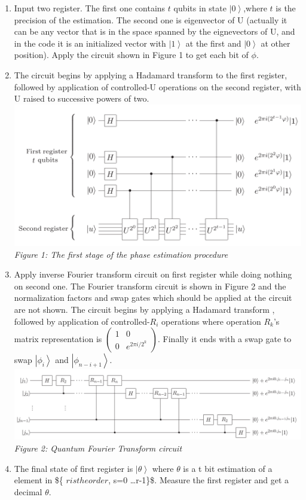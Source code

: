 \documentclass[11pt]{article}
\makeatletter
\def\maxwidth{\ifdim\Gin@nat@width>\linewidth\linewidth
    \else\Gin@nat@width\fi}
\let\Oldincludegraphics\includegraphics
\renewcommand{\includegraphics}[1]{\Oldincludegraphics[width=.8\maxwidth]{#1}}
\providecommand{\tightlist}{%
      \setlength{\itemsep}{0pt}\setlength{\parskip}{0pt}}
\makeatother
\begin{document}
\begin{enumerate}
\def\labelenumi{\arabic{enumi}.}
\tightlist
\item
  Input two register. The first one contains \(t\) qubits in state
  \(\left|{0}\right\rangle\),where \(t\) is the precision of the
  estimation. The second one is eigenvector of U (actually it can be any
  vector that is in the space spanned by the eignevectors of U, and in
  the code it is an initialized vector with \(\left|{1}\right\rangle\)
  at the first and \(\left|{0}\right\rangle\) at other position). Apply
  the circuit shown in Figure 1 to get each bit of \(\phi\).
\item
  The circuit begins by applying a Hadamard transform to the first
  register, followed by application of controlled-U operations on the
  second register, with U raised to successive powers of two.
  \includegraphics{./others/pe2.png} \emph{Figure 1: The first stage of
  the phase estimation procedure}
\item
  Apply inverse Fourier transform circuit on first register while doing
  nothing on second one. The Fourier transform circuit is shown in
  Figure 2 and the normalization factors and swap gates which should be
  applied at the circuit are not shown. The circuit begins by applying a
  Hadamard transform , followed by application of controlled-\(R_i\)
  operations where operation \(R_k\)'s matrix representation is
  \(\begin{pmatrix}1 & 0 \\0 & e^{2 \pi i / 2^k}\end{pmatrix}\). Finally
  it ends with a swap gate to swap \(\left|{\phi_i}\right\rangle\) and
  \(\left|{\phi_{n-i+1}}\right\rangle\).
  \includegraphics{./others/qft.png} \emph{Figure 2: Quantum Fourier
  Transform circuit}
\item
  The final state of first register is \(\left|{\theta}\right\rangle\)
  where \(\theta\) is a t bit estimation of a element in \$\{
  \textbar{} \(r is the order\), s=0 \dots r-1\}\$. Measure the first
  register and get a decimal \(\theta\).
\end{enumerate}
\end{document}
